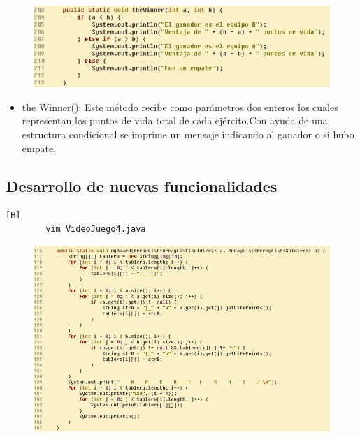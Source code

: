 \documentclass{article}
\begin{document}
		

	
	
	\begin{figure}[H]
		\centering
		\includegraphics[width=1.1\textwidth,keepaspectratio]{img/theWinner.jpg}
	\end{figure}
	
	\begin{itemize}	
		\item the Winner(): Este método recibe como parámetros dos enteros los cuales representan los puntos de vida total de cada ejército.Con ayuda de una estructura condicional se imprime un mensaje indicando al ganador o si hubo empate.
	\end{itemize}
	
	

	
	
	
	\subsection{Desarrollo de nuevas funcionalidades}
	
	\begin{lstlisting}[language=bash,caption={Se modifica los valores que el tablero mostrará }][H]
		vim VideoJuego4.java
	\end{lstlisting}
	
	\begin{figure}[H]
		\centering
		\includegraphics[width=1\textwidth,keepaspectratio]{img/board.jpg}
	\end{figure}
	
\end{document}

